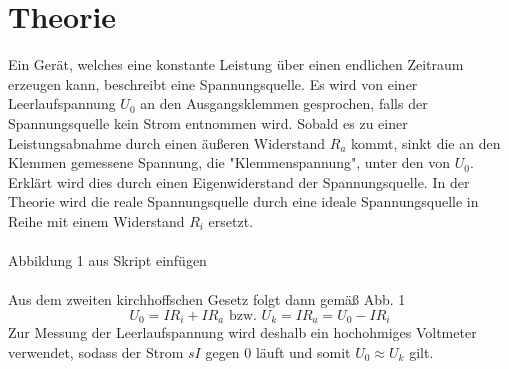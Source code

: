 \section{Theorie}
\label{sec:Theorie}

Ein Gerät, welches eine konstante Leistung über
einen endlichen Zeitraum erzeugen kann, beschreibt eine Spannungsquelle. Es wird von einer Leerlaufspannung $ U_0 $
an den Ausgangsklemmen gesprochen, falls der Spannungsquelle kein Strom entnommen wird.
Sobald es zu einer Leistungsabnahme durch einen äußeren Widerstand $ R_a $ kommt,
sinkt die an den Klemmen gemessene Spannung, die "Klemmenspannung", unter den von $ U_0 $. Erklärt wird
dies durch einen Eigenwiderstand der Spannungsquelle. In der Theorie wird die reale
Spannungsquelle durch eine ideale Spannungsquelle in Reihe mit einem Widerstand $ R_i$
ersetzt.
\\
\\
{\huge Abbildung 1 aus Skript einfügen}
\\
\\
Aus dem zweiten kirchhoffschen Gesetz folgt dann gemäß Abb. 1
\begin{equation}
	 U_0 = I R_i + I R_a  \text{ bzw. } U_k = I R_a = U_0-IR_i
\end{equation}
Zur Messung der Leerlaufspannung wird deshalb ein hochohmiges Voltmeter verwendet,
sodass der Strom $sI$ gegen $0$ läuft und somit $ U_0 \approx U_k$ gilt.

